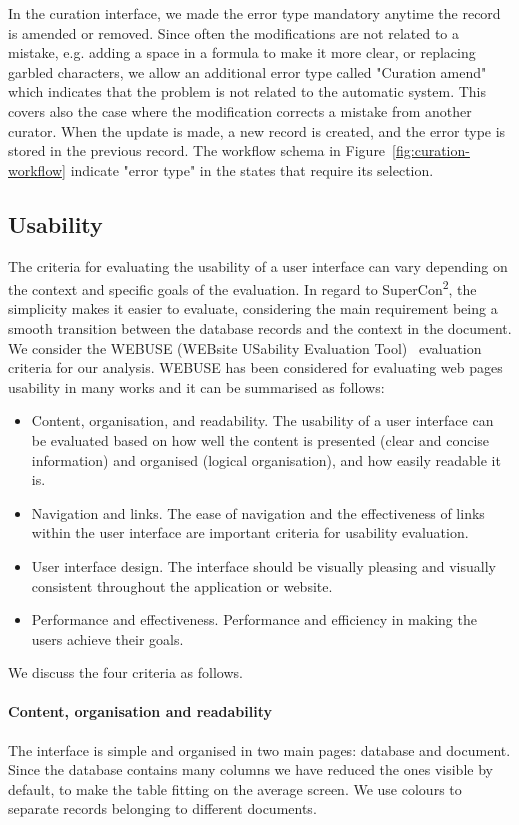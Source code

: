 \documentclass[a4paper]{article}
\begin{document}
In the curation interface, we made the error type mandatory anytime the record is amended or removed. 
Since often the modifications are not related to a mistake, e.g. adding a space in a formula to make it more clear, or replacing garbled characters, we allow an additional error type called "Curation amend" which indicates that the problem is not related to the automatic system. This covers also the case where the modification corrects a mistake from another curator. 
When the update is made, a new record is created, and the error type is stored in the previous record. The workflow schema in Figure~\ref{fig:curation-workflow} indicate "error type" in the states that require its selection. 

\subsection{Usability}
The criteria for evaluating the usability of a user interface can vary depending on the context and specific goals of the evaluation. 
In regard to SuperCon\textsuperscript{2}, the simplicity makes it easier to evaluate, considering the main requirement being a smooth transition between the database records and the context in the document. 
We consider the WEBUSE (WEBsite USability Evaluation Tool)~\cite{chiew2003webuse} evaluation criteria for our analysis. WEBUSE has been considered for evaluating web pages usability in many works and it can be summarised as follows: 
\begin{itemize}
    \item Content, organisation, and readability. The usability of a user interface can be evaluated based on how well the content is presented (clear and concise information) and organised (logical organisation), and how easily readable it is. 
    \item Navigation and links. The ease of navigation and the effectiveness of links within the user interface are important criteria for usability evaluation. 
    \item User interface design. The interface should be visually pleasing and visually consistent throughout the application or website. 
    \item Performance and effectiveness. Performance and efficiency in making the users achieve their goals.
\end{itemize}

We discuss the four criteria as follows. 
\paragraph{Content, organisation and readability} The interface is simple and organised in two main pages: database and document. Since the database contains many columns we have reduced the ones visible by default, to make the table fitting on the average screen. We use colours to separate records belonging to different documents. 
\end{document}
